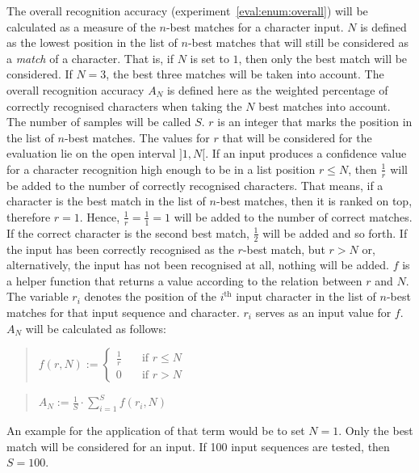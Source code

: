 The overall recognition accuracy (experiment~\ref{eval:enum:overall}) will 
be calculated as a measure of the \(n\)-best matches for a character input. 
\(N\) is defined as the lowest position in the list of \(n\)-best matches 
that will still be considered as a \emph{match} of a character. 
That is, if \(N\) is set to \(1\), then only the best match will be considered.
If \(N = 3\), the best three matches will be taken into account.
The overall recognition accuracy \(A_{N}\) is defined here as the weighted 
percentage of correctly recognised characters when taking the \(N\) best 
matches into account. The number of samples will be called \(S\).
\(r\) is an integer that marks the position in the list of \(n\)-best matches.
The values for \(r\) that will be considered for the evaluation lie 
on the open interval \(]1,N[\). If an input produces a confidence value 
for a character recognition high enough to be in a list position \(r \leq N\), 
then \(\frac{1}{r}\) will be added to the number of correctly 
recognised characters.
That means, if a character is the best match in the list of \(n\)-best matches,
then it is ranked on top, therefore \(r = 1\). 
Hence, \(\frac{1}{r} = \frac{1}{1} = 1\) will be added to the number of 
correct matches. If the correct character is the second best match, 
\(\frac{1}{2}\) will be added and so forth. If the input has been correctly 
recognised as the \(r\)-best match, but \(r > N\) or, alternatively,
the input has not been recognised at all, nothing will be added. 
\(f\) is a helper function that returns a value
according to the relation between \(r\) and \(N\). The variable
\(r_{i}\) denotes the position of the \(i^{\text{th}}\) input character in
the list of \(n\)-best matches for that input sequence and character. \(r_{i}\) serves as an input
value for \(f\). \(A_N\) will be calculated as follows:
\begin{quote}
  \(
    f(r, N):=
    \begin{cases}
      \frac{1}{r} & \quad \text{if $r \leq N$} \\
      0 & \quad \text{if $r > N$}
    \end{cases}
  \)
\end{quote}
\begin{quote}
  \(
    A_N := \frac{1}{S} \cdot \sum\limits_{i=1}^{S}{f(r_{i},N)}
  \)
\end{quote}\label{eval:accuracycalculation}
An example for the application of that term would be to set \(N = 1\).
Only the best match will be considered for an input.
If 100 input sequences are tested, then \(S=100\). 
